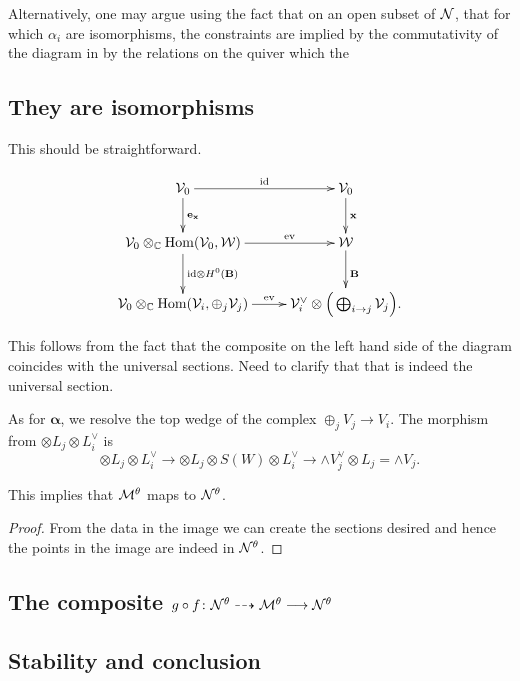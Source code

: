\documentclass{amsart}
\newcommand{\balpha}{\boldsymbol{\alpha}}
\theoremstyle{definition}
\begin{document}
Alternatively, one may argue using the fact that on an open subset of $\mathcal{N}$, that for which $\alpha_i$ are isomorphisms, the constraints are implied by the commutativity of the diagram in  by the relations on the quiver which the 

\subsection{They are isomorphisms}

This should be straightforward.

\begin{equation}
    \xymatrix{\cV_0 \ar[r]^{\text{id}} \ar[d]^{\bfe_\bfx} & \cV_0 \ar[d]^\bfx \\
    \cV_0 \otimes_\bC \Hom(\cV_0, \cW) \ar[r]^-{\text{ev}} \ar[d]^{\text{id} \otimes H^0(\bfB)} & \cW \ar[d]^\bfB \\
    \cV_0 \otimes_\bC \Hom(\cV_i, \oplus_j \cV_j) \ar[r]^-{\text{ev}} & \cV_i^\vee \otimes \Big(\bigoplus_{i \rightarrow j}\cV_j\Big).
    }
\end{equation}

This follows from the fact that the composite on the left hand side of the diagram coincides with the universal sections.
{\red Need to clarify that that is indeed the universal section.}

As for $\balpha$, we resolve the top wedge of the complex $\oplus_j V_j \rightarrow V_i$.
The morphism from $\otimes L_j \otimes L_i^\vee$ is $$\otimes L_j \otimes L_i^\vee \rightarrow \otimes L_j \otimes S(W) \otimes L_i^\vee \rightarrow \wedge V_j^\vee \otimes L_j = \wedge V_j .$$



\begin{lemma}
This implies that $\mathcal{M}^\theta$ maps to $\mathcal{N}^\theta$.
\end{lemma}

\begin{proof}
From the data in the image we can create the sections desired and hence the points in the image are indeed in $\mathcal{N}^\theta$.
\end{proof}

\subsection{The composite $g \circ f \colon \mathcal{N}^\theta \dashrightarrow \mathcal{M}^\theta \longrightarrow \mathcal{N}^\theta$}

\subsection{Stability and conclusion}
\end{document}
